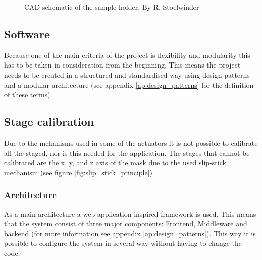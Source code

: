 \documentclass[11pt]{article}
\begin{document}
\begin{figure}[H]
\begin{minipage}[b]{0.45\textwidth}
    \caption{CAD schematic of the sample holder. By R. Stoelwinder}
    \label{fig:CAD_sample_holder}
  \end{minipage}
\end{figure}

\subsection{Software}
Because one of the main criteria of the project is flexibility and modularity this has to be taken in consideration from the beginning. 
This means the project needs to be created in a structured and standardised way using design patterns and a modular architecture (see appendix \ref{ap:design_patterns} for the definition of these terms).

\subsection{Stage calibration}
Due to the mchanisms used in some of the actuators it is not possible to calibrate all the staged,
nor is this needed for the application. 
The stages that cannot be calibrated are the x, y, and z axis of the mask due to the used slip-stick mechanism (see figure \ref{fig:slip_stick_principle})

\subsubsection{Architecture}
As a main architecture a web application inspired framework is used. 
This means that the system consist of three major components: Frontend, Middleware and backend (for more information see appendix \ref{ap:design_patterns}). 
This way it is possible to configure the system in several way without having to change the code.
\end{document}
